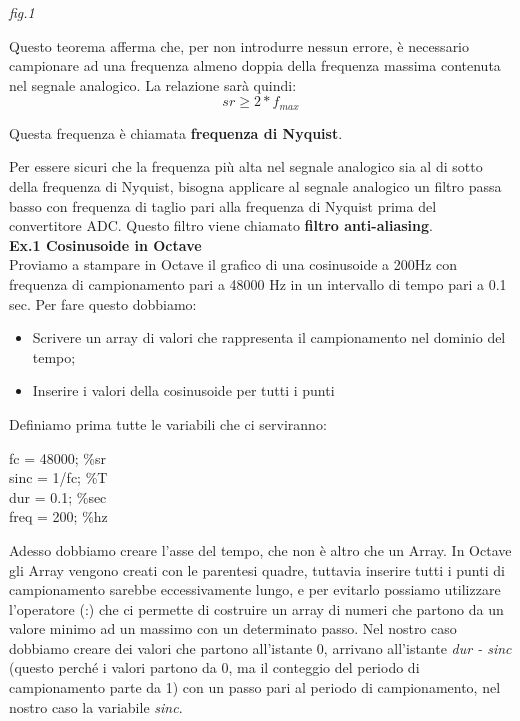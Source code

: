\documentclass[11pt]{article}
\begin{document}
\begin{multicols*}{2}
\begin{center}
{\scriptsize \emph{fig.1 }}
\end{center}

\noindent Questo teorema afferma che, per non introdurre nessun errore, è necessario campionare ad una frequenza almeno doppia della frequenza massima contenuta nel segnale analogico. La relazione sarà quindi: 
\[
sr\ge 2* f_{max}
\]

\noindent Questa frequenza è chiamata \textbf{frequenza di Nyquist}.

Per essere sicuri che la frequenza più alta nel segnale analogico sia al di sotto della frequenza di Nyquist, bisogna applicare al segnale analogico un filtro passa basso con frequenza di taglio pari alla frequenza di Nyquist prima del convertitore ADC. Questo filtro viene chiamato \textbf{filtro anti-aliasing}.  \\

\textbf{\textsf {Ex.1 Cosinusoide in Octave}}\\

\noindent Proviamo a stampare in Octave il grafico di una cosinusoide a 200Hz con frequenza di campionamento pari a 48000 Hz in un intervallo di tempo pari a 0.1 sec.
Per fare questo dobbiamo:

\begin{itemize}
\item Scrivere un array di valori che rappresenta il campionamento nel dominio del tempo;
\item Inserire i valori della cosinusoide per tutti i punti
\end{itemize}

\noindent Definiamo prima tutte le variabili che ci serviranno:

\begin{center}
\begin{minipage}[c]{3cm}
\begin{sffamily}

fc = 48000;    \%sr\\
sinc = 1/fc;   \%T\\
dur = 0.1;      \%sec\\
freq = 200;    \%hz\\

\end{sffamily}
\end{minipage}
\end{center}

\noindent Adesso dobbiamo creare l’asse del tempo, che non è altro che un Array. In Octave gli Array vengono creati con le parentesi quadre, tuttavia inserire tutti i punti di campionamento sarebbe eccessivamente lungo, e per evitarlo possiamo utilizzare l’operatore (:) che ci permette di costruire un array di numeri che partono da un valore minimo ad un massimo con un determinato passo. Nel nostro caso dobbiamo creare dei valori che partono all’istante 0, arrivano all’istante \textit{dur - sinc} (questo perché i valori partono da 0, ma il conteggio del periodo di campionamento parte da 1) con un passo pari al periodo di campionamento, nel nostro caso la variabile \textit{sinc}.


\end{multicols*}
\end{document}
